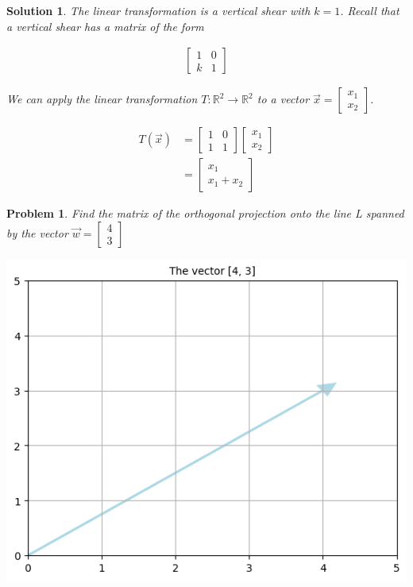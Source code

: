 \documentclass{article}
\newtheorem{problem}{Problem}
\newtheorem*{solution}{Solution}
\begin{document}
\begin{solution}
The linear transformation is a vertical shear with $k = 1$. Recall that a vertical shear has a matrix of the form 

\begin{align*}
\begin{bmatrix}
1 & 0 \\
k & 1
\end{bmatrix}
\end{align*}

We can apply the linear transformation $T : \mathbb{R}^2 \to \mathbb{R}^2$ to a vector $\vec{x} = \begin{bmatrix} x_{1} \\ x_{2} \end{bmatrix}$.

\begin{align*}
T(\vec{x}) &=
\begin{bmatrix}
1 & 0 \\
1 & 1
\end{bmatrix} \begin{bmatrix} x_{1} \\ x_{2} \end{bmatrix} \\
&= \begin{bmatrix} x_{1} \\ x_{1} + x_{2} \end{bmatrix}
\end{align*}
\end{solution}

\begin{problem}
Find the matrix of the orthogonal projection onto the line L spanned by the vector $\vec{w} = \begin{bmatrix} 4 \\ 3 \end{bmatrix}$

\includegraphics[scale=0.5, center]{vector43} 
\end{problem}
\end{document}
